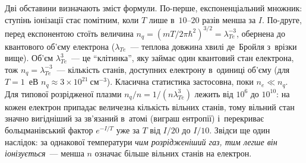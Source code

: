 Дві обставини визначають зміст формули. По-перше, експоненціальний множник: ступінь
іонізації стає помітним, коли $T$ лише в~$10$--$20$ разів менша за $I$.
По-друге, перед експонентою стоїть величина $n_q=(mT/2\pi\hbar^2)^{3/2}=\lambda_{Te}^{-3}$,
обернена до квантового об'єму електрона ($\lambda_{Te}$~--- теплова довжина хвилі де~Бройля
з~врізки вище). Об'єм $\lambda_{Te}^3$~--- це \enquote{клітинка}, яку займає один квантовий стан електрона, тож $n_q=\lambda_{Te}^{-3}$~--- кількість
станів, доступних електрону в~одиниці об'єму (для $T=1$~еВ $n_q\approx3\times10^{21}~\mathrm{см}^{-3}$). Класична статистика
застосовна, поки $n_e\ll n_q$. Для типової розрідженої плазми
$n_q/n=1/(n\lambda_{Te}^3)$ лежить від $10^{6}$ до $10^{10}$: на кожен електрон припадає величезна кількість вільних станів, тому
вільний стан значно вигідніший за зв'язаний в~атомі (виграш ентропії) і~перекриває
больцманівський фактор $e^{-I/T}$ уже за $T$ від $I/20$ до $I/10$.
Звідси ще один наслідок: за однакової температури \emph{чим розрідженіший газ, тим легше він іонізується}~---
менша $n$ означає більше вільних станів на електрон.

